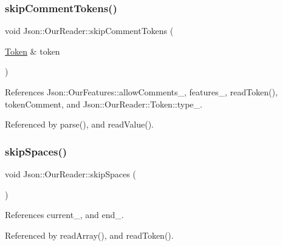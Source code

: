 \mbox{\label{classJson_1_1OurReader_a856dea44d92578c276856d7a65a4ebdc_a856dea44d92578c276856d7a65a4ebdc}} 
\subsubsection{\texorpdfstring{skip\+Comment\+Tokens()}{skipCommentTokens()}}
{\footnotesize\ttfamily void Json\+::\+Our\+Reader\+::skip\+Comment\+Tokens (\begin{DoxyParamCaption}\item[{\hyperlink{classJson_1_1OurReader_1_1Token}{Token} \&}]{token }\end{DoxyParamCaption})\hspace{0.3cm}{\ttfamily [private]}}



References Json\+::\+Our\+Features\+::allow\+Comments\+\_\+, features\+\_\+, read\+Token(), token\+Comment, and Json\+::\+Our\+Reader\+::\+Token\+::type\+\_\+.



Referenced by parse(), and read\+Value().

\mbox{\label{classJson_1_1OurReader_a6fbc6d58a4505e5ccadf330b57b17ca5_a6fbc6d58a4505e5ccadf330b57b17ca5}} 
\subsubsection{\texorpdfstring{skip\+Spaces()}{skipSpaces()}}
{\footnotesize\ttfamily void Json\+::\+Our\+Reader\+::skip\+Spaces (\begin{DoxyParamCaption}{ }\end{DoxyParamCaption})\hspace{0.3cm}{\ttfamily [private]}}



References current\+\_\+, and end\+\_\+.



Referenced by read\+Array(), and read\+Token().

